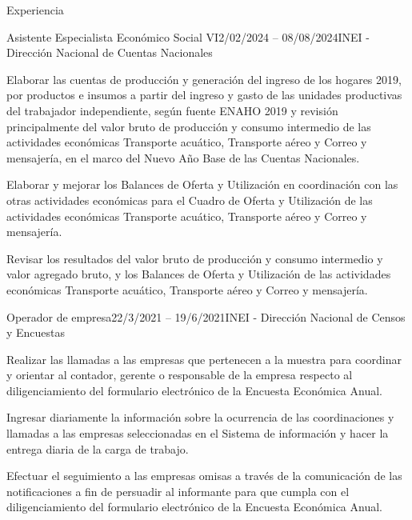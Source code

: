 \documentclass[
11pt, %
]{resume} %
\begin{document}
\begin{rSection}{Experiencia}
		\begin{rSubsection}{Asistente Especialista Económico Social VI}{2/02/2024 – 08/08/2024}{INEI - Dirección Nacional de Cuentas Nacionales}{}
			
			\item Elaborar las cuentas de producción y generación del ingreso de los hogares 2019, por productos e insumos a partir del ingreso y gasto de las unidades productivas del trabajador independiente, según fuente ENAHO 2019 y revisión principalmente del valor bruto de producción y consumo intermedio de las actividades económicas Transporte acuático, Transporte aéreo y Correo y mensajería, en el marco del Nuevo Año Base de las Cuentas Nacionales.
			\item Elaborar y mejorar los Balances de Oferta y Utilización en coordinación con las otras actividades económicas para el Cuadro de Oferta y Utilización de las actividades económicas Transporte acuático, Transporte aéreo y Correo y mensajería. 
			\item Revisar los resultados del valor bruto de producción y consumo intermedio y valor agregado bruto, y los Balances de Oferta y Utilización de las actividades económicas Transporte acuático, Transporte aéreo y Correo y mensajería. 
			
		\end{rSubsection}
		
		
		\begin{rSubsection}{Operador de empresa}{22/3/2021 – 19/6/2021}{INEI - Dirección Nacional de Censos y Encuestas}{}
			\item Realizar las llamadas a las empresas que pertenecen a la muestra para coordinar y orientar al contador, gerente o responsable de la empresa respecto al diligenciamiento del formulario electrónico de la Encuesta Económica Anual.
			\item Ingresar diariamente la información sobre la ocurrencia de las coordinaciones y llamadas a las empresas seleccionadas en el Sistema de información y hacer la entrega diaria de la carga de trabajo.
			\item Efectuar el seguimiento a las empresas omisas a través de la comunicación de las notificaciones a fin de persuadir al informante para que cumpla con el diligenciamiento del formulario electrónico de la Encuesta Económica Anual.
		\end{rSubsection}
		
		

\end{rSection}
\end{document}
